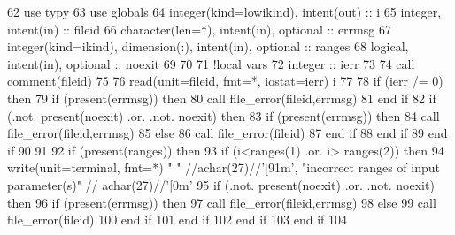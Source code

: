 \begin{DoxyCode}
62       \textcolor{keywordtype}{use }typy
63       \textcolor{keywordtype}{use }globals
64       \textcolor{keywordtype}{integer(kind=lowikind)}, \textcolor{keywordtype}{intent(out)} :: i
65       \textcolor{keywordtype}{integer}, \textcolor{keywordtype}{intent(in)} :: fileid
66       \textcolor{keywordtype}{character(len=*)}, \textcolor{keywordtype}{intent(in)}, \textcolor{keywordtype}{optional} :: errmsg
67       \textcolor{keywordtype}{integer(kind=ikind)}, \textcolor{keywordtype}{dimension(:)}, \textcolor{keywordtype}{intent(in)},  \textcolor{keywordtype}{optional} :: ranges
68       \textcolor{keywordtype}{logical}, \textcolor{keywordtype}{intent(in)}, \textcolor{keywordtype}{optional} :: noexit
69 
70 
71       \textcolor{comment}{!local vars}
72       \textcolor{keywordtype}{integer} :: ierr
73 
74       \textcolor{keyword}{call }comment(fileid)
75 
76       \textcolor{keyword}{read}(unit=fileid, fmt=*, iostat=ierr) i
77 
78       \textcolor{keywordflow}{if} (ierr /= 0) \textcolor{keywordflow}{then}
79         \textcolor{keywordflow}{if} (\textcolor{keyword}{present}(errmsg)) \textcolor{keywordflow}{then}
80           \textcolor{keyword}{call }file_error(fileid,errmsg)
81 \textcolor{keywordflow}{        end if}
82         \textcolor{keywordflow}{if} (.not. \textcolor{keyword}{present}(noexit) .or. .not. noexit) \textcolor{keywordflow}{then}
83           \textcolor{keywordflow}{if} (\textcolor{keyword}{present}(errmsg)) \textcolor{keywordflow}{then}
84             \textcolor{keyword}{call }file_error(fileid,errmsg)
85           \textcolor{keywordflow}{else}
86             \textcolor{keyword}{call }file_error(fileid)
87 \textcolor{keywordflow}{          end if}
88 \textcolor{keywordflow}{        end if}
89 \textcolor{keywordflow}{      end if}
90       
91       
92        \textcolor{keywordflow}{if} (\textcolor{keyword}{present}(ranges)) \textcolor{keywordflow}{then}
93         \textcolor{keywordflow}{if} (i<ranges(1) .or. i> ranges(2)) \textcolor{keywordflow}{then}
94           \textcolor{keyword}{write}(unit=terminal, fmt=*) \textcolor{stringliteral}{" "} //achar(27)//\textcolor{stringliteral}{'[91m'}, \textcolor{stringliteral}{"incorrect ranges of input parameter(s)"}\textcolor{comment}{ //
      achar(27)//}\textcolor{stringliteral}{'[0m'}
95           \textcolor{keywordflow}{if} (.not. \textcolor{keyword}{present}(noexit) .or. .not. noexit) \textcolor{keywordflow}{then}
96             \textcolor{keywordflow}{if} (\textcolor{keyword}{present}(errmsg)) \textcolor{keywordflow}{then}
97               \textcolor{keyword}{call }file_error(fileid,errmsg)
98             \textcolor{keywordflow}{else}
99               \textcolor{keyword}{call }file_error(fileid)
100 \textcolor{keywordflow}{            end if}
101 \textcolor{keywordflow}{          end if}
102 \textcolor{keywordflow}{        end if}
103 \textcolor{keywordflow}{      end if}
104 
\end{DoxyCode}


